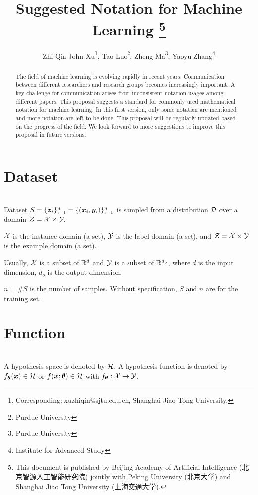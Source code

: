 \documentclass{article}
\begin{document}
\title{Suggested Notation for Machine Learning \thanks{This document is published by Beijing Academy of Artificial Intelligence (北京智源人工智能研究院) jointly with Peking University (北京大学) and Shanghai Jiao Tong University (上海交通大学).}}
\author{Zhi-Qin John Xu\thanks{Corresponding: xuzhiqin@sjtu.edu.cn, Shanghai Jiao Tong University.}, Tao Luo\thanks{Purdue University}, Zheng Ma\thanks{Purdue University}, Yaoyu Zhang\thanks{Institute for Advanced Study}}

\maketitle 
\begin{abstract}
The field of machine learning is evolving rapidly in recent years. Communication between different researchers and research groups becomes increasingly important. A key challenge for communication arises from inconsistent notation usages among different papers. This proposal suggests a standard for commonly used mathematical notation for machine learning. In this first version, only some notation are mentioned and more notation are left to be done. This proposal will be regularly updated based on the progress of the field. We look forward to more suggestions to improve this proposal in future versions.
\end{abstract}

\tableofcontents

\section{Dataset}~\\
Dataset  $S=\{\bm{z}_i\}_{i=1}^n=\{(\bm{x}_i,\bm{y}_i)\}_{i=1}^n$ is sampled from a distribution $\mathcal{D}$ over a domain $\mathcal{Z}=\mathcal{X}\times\mathcal{Y}$. 

$\mathcal{X}$  is the instance domain (a set), $\mathcal{Y}$ is the label domain (a set), and $\mathcal{Z}=\mathcal{X}\times\mathcal{Y}$ is the example domain (a set). 

Usually, 
$\mathcal{X}$ is a subset of $\mathbb{R}^d$ and $\mathcal{Y}$ is a subset of $\mathbb{R}^{d_{o}}$, where $d$ is the input dimension, $d_{o}$ is the output dimension.

$n=\#S$ is the number of samples. Without specification, $S$ and $n$ are for the training set.

\section{Function}~\\
A hypothesis space is denoted by $\mathcal{H}$. A hypothesis function is denoted by $f_{\bm{\theta}}(\bm{x})\in\mathcal{H}$ or $f(\bm{x};\bm{\theta})\in\mathcal{H}$ with $f_{\bm{\theta}}:\mathcal{X}\to\mathcal{Y}$.
\end{document}
